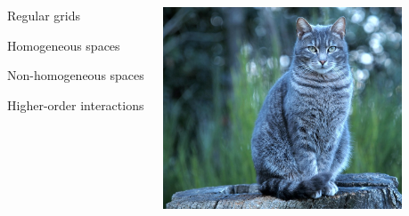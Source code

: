 \documentclass[landscape,a0paper,blockverticalspace = 5mm]{tikzposter}
\begin{document}
\begin{columns}
{{\begin{center}
       \end{center}  
       
       
       
\begin{center}
\begin{minipage}{0.16\linewidth}
		\begin{center}
		Regular grids
	\end{center}		       
      \end{minipage}
      \begin{minipage}{0.1\linewidth}
         \begin{center}	   
	\end{center}
      \end{minipage} 
	\begin{minipage}{0.16\linewidth}
         \begin{center}
		Homogeneous spaces
	\end{center}
      \end{minipage}    
      \begin{minipage}{0.1\linewidth}
         \begin{center}	   
	\end{center}
      \end{minipage} 
	\begin{minipage}{0.16\linewidth}
         \begin{center}
		Non-homogeneous spaces
	\end{center}
      \end{minipage}
     \begin{minipage}{0.1\linewidth}
         \begin{center}	   
	\end{center}
      \end{minipage} 
	\begin{minipage}{0.16\linewidth}
         \begin{center}
		Higher-order interactions
	\end{center}
      \end{minipage}
      
       \end{center}  
       
       
\begin{center}
		 \begin{minipage}{0.16\linewidth}
		 \begin{center}
		
          \includegraphics[height=6cm]{figures/cat.jpg}
          \vspace{0.5cm}


\end{center}
\end{minipage}
\end{center}}}
\end{columns}
\end{document}
